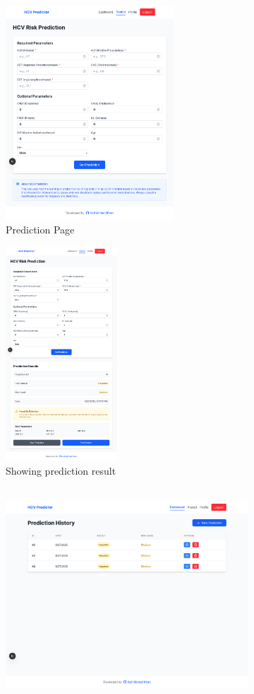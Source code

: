 \begin{figure}[htbp]
  \begin{subfigure}{0.5\textwidth}
    \includegraphics[width=0.9\linewidth, height=8cm]{figures/site/predict.png} 
    \caption{Prediction Page}
    \label{fig:subim1}
  \end{subfigure}
  \begin{subfigure}{0.5\textwidth}
    \includegraphics[width=0.9\linewidth, height=8cm]{figures/site/prediction02.png}
    \caption{Showing prediction result}
    \label{fig:predict}
  \end{subfigure}
  \begin{subfigure}{0.5\textwidth}
    \includegraphics[width=0.9\linewidth, height=8cm]{figures/site/dashboard.png}

\end{subfigure}
\end{figure}
